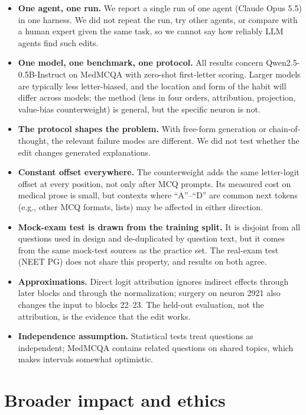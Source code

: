 \documentclass[11pt]{article}
\begin{document}
\begin{itemize}
\item \textbf{One agent, one run.} We report a single run of one agent (Claude Opus 5.5) in one harness. We did not repeat the run, try other agents, or compare with a human expert given the same task, so we cannot say how reliably LLM agents find such edits.
\item \textbf{One model, one benchmark, one protocol.} All results concern Qwen2.5-0.5B-Instruct on MedMCQA with zero-shot first-letter scoring. Larger models are typically less letter-biased, and the location and form of the habit will differ across models; the method (lens in four orders, attribution, projection, value-bias counterweight) is general, but the specific neuron is not.
\item \textbf{The protocol shapes the problem.} With free-form generation or chain-of-thought, the relevant failure modes are different. We did not test whether the edit changes generated explanations.
\item \textbf{Constant offset everywhere.} The counterweight adds the same letter-logit offset at every position, not only after MCQ prompts. Its measured cost on medical prose is small, but contexts where ``A''--``D'' are common next tokens (e.g., other MCQ formats, lists) may be affected in either direction.
\item \textbf{Mock-exam test is drawn from the training split.} It is disjoint from all questions used in design and de-duplicated by question text, but it comes from the same mock-test sources as the practice set. The real-exam test (NEET PG) does not share this property, and results on both agree.
\item \textbf{Approximations.} Direct logit attribution ignores indirect effects through later blocks and through the normalization; surgery on neuron 2921 also changes the input to blocks 22--23. The held-out evaluation, not the attribution, is the evidence that the edit works.
\item \textbf{Independence assumption.} Statistical tests treat questions as independent; MedMCQA contains related questions on shared topics, which makes intervals somewhat optimistic.
\end{itemize}

\section{Broader impact and ethics}
\end{document}
